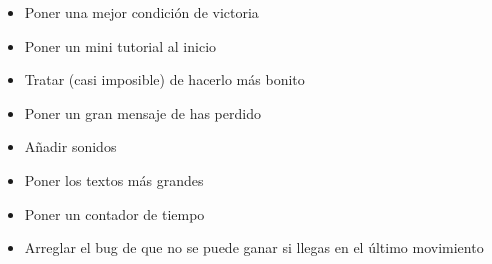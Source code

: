 \documentclass{article}
\begin{document}
\begin{itemize}
    \item Poner una mejor condición de victoria
    \item Poner un mini tutorial al inicio
    \item Tratar (casi imposible) de hacerlo más bonito
    \item Poner un gran mensaje de has perdido
    \item Añadir sonidos
    \item Poner los textos más grandes
    \item Poner un contador de tiempo
    \item Arreglar el bug de que no se puede ganar si llegas en el último movimiento
\end{itemize}
\end{document}
